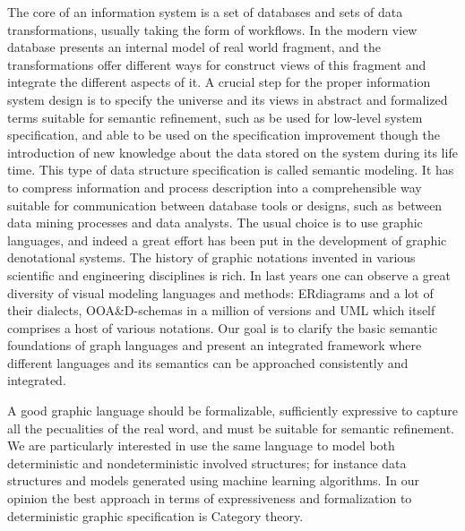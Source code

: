 \documentclass[oribibl]{llncs}
\begin{document}
The core of an information
system is a set of databases and sets of data transformations,
usually taking the form of workflows. In the modern view database
presents an internal model of real world fragment, and the
transformations offer different ways for construct views of this
fragment and integrate the different aspects of it. A
crucial step for the proper information system design is to specify
the universe and its views in abstract and formalized terms suitable
for semantic refinement, such as be used for low-level system
specification, and able to be used on the specification improvement
though the introduction of new knowledge about the data stored on
the system during its life time. This type of data structure
specification is called semantic modeling. It has to compress
information and process description into a comprehensible way
suitable for communication between database tools or designs, such
as between data mining processes and data analysts. The usual choice
is to use graphic languages, and indeed a great effort has been put
in the development of graphic denotational systems. The history of
graphic notations invented in various scientific and engineering
disciplines is rich. In last years one can observe a great diversity
of visual modeling languages and methods: ERdiagrams and a lot of
their dialects, OOA\&D-schemas in a million of versions and UML which itself comprises a host of various
notations. Our goal is to clarify the basic semantic foundations of
graph languages and present an integrated framework where different
languages and its semantics can be approached consistently and
integrated.

A good graphic language should be formalizable, sufficiently
expressive to capture all the pecualities of the real word, and must
be suitable for semantic refinement. We are particularly interested
in use the same language to model both deterministic and nondeterministic involved structures; for instance data structures and
models generated using machine learning algorithms. In our opinion the best
approach in terms of expressiveness and formalization  to
deterministic graphic specification is Category theory.
\end{document}
